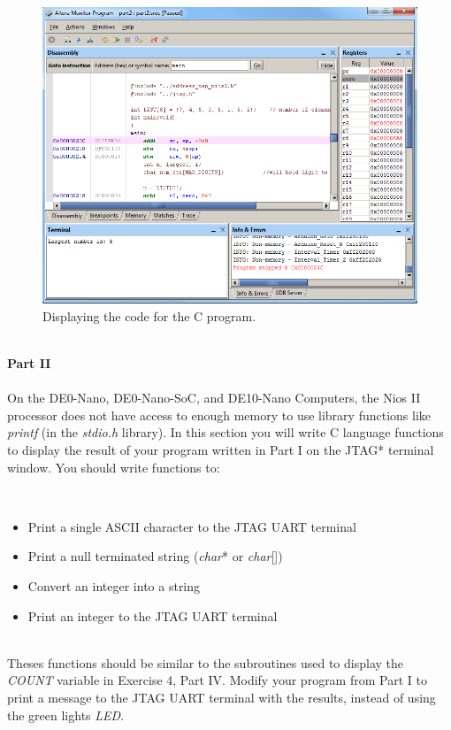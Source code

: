\documentclass[epsfig,10pt,fullpage]{article}
\begin{document}
\begin{figure}[H]
	\begin{center}
	\includegraphics[scale=0.58]{figures/figureMP_goto.png}
	\end{center}
	\caption{Displaying the code for the C program.}
\label{fig:MPgoto}
\end{figure}

~\\
\noindent
{\bf Part II}
~\\
~\\
\noindent
On the DE0-Nano, DE0-Nano-SoC, and DE10-Nano Computers, the Nios II processor does not have access to enough memory to 
use library functions like {\it printf} (in the {\it stdio.h} library). In this section you will 
write C language functions to display the result of your program written in Part I on the JTAG* 
terminal window. You should write functions to:

~\\
\begin{itemize}
\item Print a single ASCII character to the JTAG UART terminal
\item Print a null terminated string ({\it char}* or {\it char}{[}{]})
\item Convert an integer into a string
\item Print an integer to the JTAG UART terminal
\end{itemize}
~\\
\noindent
Theses functions should be similar to the subroutines used to display the {\it COUNT } variable 
in Exercise 4, Part IV. Modify your program from Part I to print a message to the JTAG UART terminal 
with the results, instead of using the green lights {\it LED}.
\end{document}
